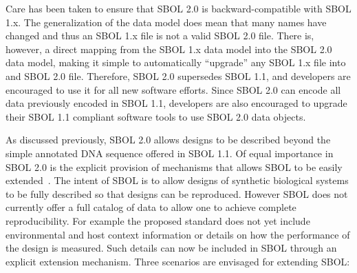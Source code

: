 
Care has been taken to ensure that SBOL 2.0 is backward-compatible with SBOL 1.x.  
The generalization of the data model does mean that many names have changed and thus an SBOL 1.x file is not a valid SBOL 2.0 file.
There is, however, a direct mapping from the SBOL 1.x data model into the SBOL 2.0 data model, making it simple to automatically ``upgrade'' any SBOL 1.x file into and SBOL 2.0 file.
Therefore, SBOL 2.0 supersedes SBOL 1.1, and developers are encouraged to use it for all new software efforts.  Since SBOL 2.0 can encode all data previously encoded in SBOL 1.1, developers are also encouraged to upgrade their SBOL 1.1 compliant software tools to use SBOL 2.0 data objects. 



As discussed previously, SBOL 2.0 allows designs to be described beyond the simple annotated DNA sequence offered in SBOL 1.1. Of equal importance in SBOL 2.0 is the explicit provision of mechanisms that allows SBOL to be easily extended~\cite{sec:Annotations}. The intent of SBOL is to allow designs of synthetic biological systems to be fully described so that designs can be reproduced. However SBOL does not currently offer a full catalog of data to allow one to achieve complete reproducibility. For example the proposed standard does not yet include environmental and host context information or details on how the performance of the design is measured. Such details can now be included in SBOL through an explicit extension mechanism. Three scenarios are envisaged for extending SBOL:


